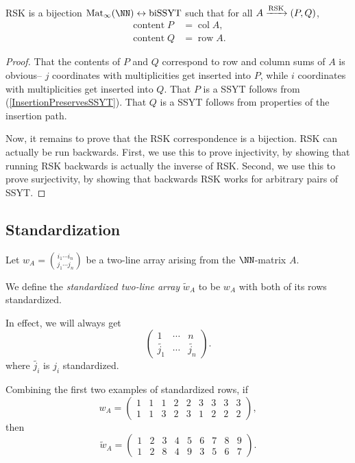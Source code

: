 \documentclass{article}
\DeclareMathOperator{\RSK}{RSK}
\DeclareMathOperator{\row}{row}
\DeclareMathOperator{\col}{col}
\DeclareMathOperator{\content}{content}
\DeclareMathOperator{\biSSYT}{biSSYT}
\DeclareMathOperator{\Mat}{Mat}
\newcommand{\rskarrow}{\ensuremath\xrightarrow{\RSK}}
\begin{document}
\begin{theorem}
    RSK is a bijection $\Mat_\infty(\NN) \leftrightarrow \biSSYT$ such that for all $A \rskarrow (P,Q)$,
    \begin{align*}
        \content P &= \col A, \\
        \content Q &= \row A.
    \end{align*}
\end{theorem}

\begin{proof}
    That the contents of $P$ and $Q$ correspond to row and column sums of $A$ is obvious-- $j$ coordinates with multiplicities get inserted into $P$, while $i$ coordinates with multiplicities get inserted into $Q$.
    That $P$ is a SSYT follows from (\ref{InsertionPreservesSSYT}).
    That $Q$ is a SSYT follows from properties of the insertion path.

    Now, it remains to prove that the RSK correspondence is a bijection. 
    RSK can actually be run backwards. 
    First, we use this to prove injectivity, by showing that running RSK backwards is actually the inverse of RSK. 
    Second, we use this to prove surjectivity, by showing that backwards RSK works for arbitrary pairs of SSYT.

\end{proof}

\subsection{Standardization}


\begin{definition}
    Let $w_A = \binom{i_1\cdots i_n}{j_1\cdots j_n}$ be a two-line array arising from the $\NN$-matrix $A$.

    We define the \textit{standardized two-line array} $\widetilde{w}_A$ to be $w_A$ with both of its rows standardized. 
\end{definition}

In effect, we will always get 
\[
    \begin{pmatrix}
        1 & \cdots & n \\
        \widetilde{j_1} & \cdots & \widetilde{j_n}
    \end{pmatrix}.
\]
where $\widetilde{j_i}$ is $j_i$ standardized.

\begin{example}
    Combining the first two examples of standardized rows, if
    \[
        w_A = \begin{pmatrix}
            1 & 1 & 1 & 2 & 2 & 3 & 3 & 3 & 3 \\
            1 & 1 & 3 & 2 & 3 & 1 & 2 & 2 & 2
        \end{pmatrix},
    \]
    then
    \[
        \widetilde{w}_A = \begin{pmatrix}
            1 & 2 & 3 & 4 & 5 & 6 & 7 & 8 & 9 \\
1 & 2 & 8 & 4 & 9 & 3 & 5 & 6 & 7
        \end{pmatrix}.
    \]
\end{example}
\end{document}
